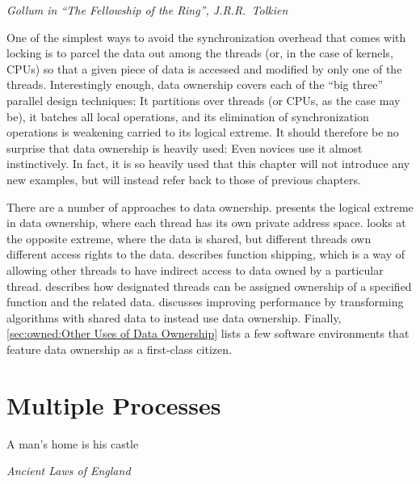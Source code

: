 
%
	 {\emph{Gollum in ``The Fellowship of the Ring'', J.R.R.~Tolkien}}

One of the simplest ways to avoid the synchronization overhead that
comes with locking is to parcel the data out among the threads (or,
in the case of kernels, CPUs)
so that a given piece of data is accessed and modified by only one
of the threads.
Interestingly enough, data ownership covers each of the ``big three''
parallel design techniques:
It partitions over threads (or CPUs, as the case may be),
it batches all local operations,
and its elimination of synchronization operations is weakening
carried to its logical extreme.
It should therefore be no surprise that data ownership is heavily used:
Even novices use it almost instinctively.
In fact, it is so heavily used that this chapter will not introduce any
new examples, but will instead refer back to those of previous chapters.

\QuickQuizEnd

There are a number of approaches to data ownership.
 presents the logical extreme
in data ownership, where each thread has its own private address space.
 looks at
the opposite extreme, where the data is shared, but different threads
own different access rights to the data.
 describes function shipping,
which is a way of allowing other threads to have indirect access to
data owned by a particular thread.
 describes how designated
threads can be assigned ownership of a specified function and the
related data.
 discusses improving performance
by transforming algorithms with shared data to instead use data ownership.
Finally, \cref{sec:owned:Other Uses of Data Ownership} lists
a few software environments that feature data ownership as a
first-class citizen.

\section{Multiple Processes}
\label{sec:owned:Multiple Processes}
%
\epigraph{A man's home is his castle}{\emph{Ancient Laws of England}}

